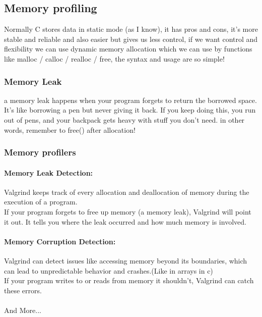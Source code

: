 \documentclass[titlepage]{article}
\begin{document}
\subsection{Memory profiling}
Normally C stores data in static mode (as I know), it has pros and cons, it's more stable and reliable and also easier but gives us less control, if we want control and flexibility we can use dynamic memory allocation
which we can use by functions like malloc / calloc / realloc / free, \newline the syntax and usage are so simple!
\subsubsection{Memory Leak}
a memory leak happens when your program forgets to return the borrowed space. It's like borrowing a pen but never giving it back. If you keep doing this, you run out of pens, and your backpack gets heavy with stuff you don't need.\newline
in other words, remember to free() after allocation!
\subsubsection{Memory profilers}
\paragraph{Memory Leak Detection:}
Valgrind keeps track of every allocation and deallocation of memory during the execution of a program.\\
If your program forgets to free up memory (a memory leak), Valgrind will point it out. It tells you where the leak occurred and how much memory is involved.
\paragraph{Memory Corruption Detection:}
Valgrind can detect issues like accessing memory beyond its boundaries, which can lead to unpredictable behavior and crashes.(Like in arrays in c)\\
If your program writes to or reads from memory it shouldn't, Valgrind can catch these errors.
\\\\ And More...
\end{document}
